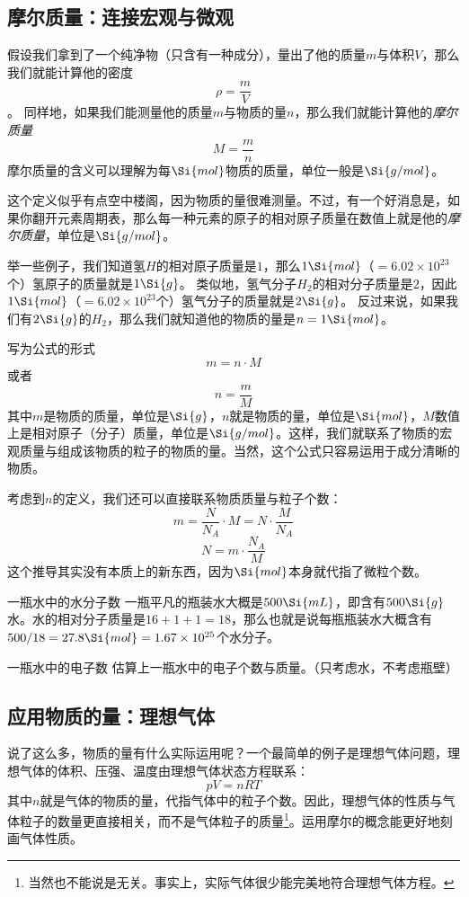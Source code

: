 \subsection{摩尔质量：连接宏观与微观}
假设我们拿到了一个纯净物（只含有一种成分），量出了他的质量$m$与体积$V$，那么我们就能计算他的密度
$$\rho = \frac{m}{V}$$。
同样地，如果我们能测量他的质量$m$与物质的量$n$，那么我们就能计算他的\textsl{摩尔质量}
$$M = \frac{m}{n}$$
摩尔质量的含义可以理解为每$\Si{mol}$物质的质量，单位一般是$\Si{g/mol}$。

这个定义似乎有点空中楼阁，因为物质的量很难测量。不过，有一个好消息是，如果你翻开元素周期表，那么每一种元素的原子的相对原子质量在数值上就是他的\textsl{摩尔质量}，单位是$\Si{g/mol}$。

举一些例子，我们知道氢$H$的相对原子质量是$1$，那么$1 \Si{mol}$（$=6.02\times 10^{23}$个）氢原子的质量就是$1 \Si{g}$。
类似地，氢气分子$H_2$的相对分子质量是$2$，因此$1 \Si{mol}$（$=6.02\times 10^{23}$个）氢气分子的质量就是$2 \Si{g}$。
反过来说，如果我们有$2 \Si{g}$的$H_2$，那么我们就知道他的物质的量是$n=1 \Si{mol}$。

写为公式的形式
$$m = n \cdot M$$
或者
$$n = \frac{m}{M}$$
其中$m$是物质的质量，单位是$\Si{g}$，$n$就是物质的量，单位是$\Si{mol}$，$M$数值上是相对原子（分子）质量，单位是$\Si{g/mol}$。这样，我们就联系了物质的宏观质量与组成该物质的粒子的物质的量。当然，这个公式只容易运用于成分清晰的物质。

考虑到$n$的定义，我们还可以直接联系物质质量与粒子个数：
$$m = \frac{N}{N_A} \cdot M = N \cdot \frac{M}{N_A}$$
$$N = m \cdot \frac{N_A}{M}$$
这个推导其实没有本质上的新东西，因为$\Si{mol}$本身就代指了微粒个数。

\begin{example}{一瓶水中的水分子数}
一瓶平凡的瓶装水大概是$500 \Si{mL}$，即含有$500 \Si{g}$水。水的相对分子质量是$16+1+1=18$，那么也就是说每瓶瓶装水大概含有$500/18=27.8 \Si{mol} = 1.67 \times 10^{25}$个水分子。
\end{example}

\begin{exercise}{一瓶水中的电子数}
估算上一瓶水中的电子个数与质量。（只考虑水，不考虑瓶壁）
\end{exercise}

\subsection{应用物质的量：理想气体}
说了这么多，物质的量有什么实际运用呢？一个最简单的例子是理想气体问题，理想气体的体积、压强、温度由理想气体状态方程联系：
$$pV=nRT$$
其中$n$就是气体的物质的量，代指气体中的粒子个数。因此，理想气体的性质与气体粒子的数量更直接相关，而不是气体粒子的质量\footnote{当然也不能说是无关。事实上，实际气体很少能完美地符合理想气体方程。}。运用摩尔的概念能更好地刻画气体性质。

